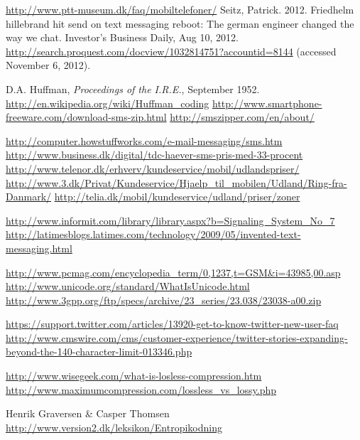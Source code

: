  {\url{http://www.ptt-museum.dk/faq/mobiltelefoner/}}
 Seitz, Patrick. 2012. Friedhelm hillebrand hit send on text messaging reboot: The german engineer changed the way we chat. Investor's Business Daily, Aug 10, 2012. \url{http://search.proquest.com/docview/1032814751?accountid=8144} (accessed November 6, 2012).

 D.A. Huffman, {\it Proceedings of the I.R.E.}, September 1952.
 {\url{http://en.wikipedia.org/wiki/Huffman_coding}}
 {\url{http://www.smartphone-freeware.com/download-sms-zip.html}}
 {\url{http://smszipper.com/en/about/}}

 {\url{http://computer.howstuffworks.com/e-mail-messaging/sms.htm}}
 {\url{http://www.business.dk/digital/tdc-haever-sms-pris-med-33-procent}}
 {\url{http://www.telenor.dk/erhverv/kundeservice/mobil/udlandspriser/}}
 {\url{http://www.3.dk/Privat/Kundeservice/Hjaelp_til_mobilen/Udland/Ring-fra-Danmark/}}
 {\url{http://telia.dk/mobil/kundeservice/udland/priser/zoner}}

 {\url{http://www.informit.com/library/library.aspx?b=Signaling_System_No_7}}
 {\url{http://latimesblogs.latimes.com/technology/2009/05/invented-text-messaging.html}}

 {\url{http://www.pcmag.com/encyclopedia_term/0,1237,t=GSM&i=43985,00.asp}}
 {\url{http://www.unicode.org/standard/WhatIsUnicode.html}}
 {\url{http://www.3gpp.org/ftp/specs/archive/23_series/23.038/23038-a00.zip}}


 {\url{https://support.twitter.com/articles/13920-get-to-know-twitter-new-user-faq}}
 {\url{http://www.cmswire.com/cms/customer-experience/twitter-stories-expanding-beyond-the-140-character-limit-013346.php}}

 {\url{http://www.wisegeek.com/what-is-losless-compression.htm}}
 {\url{http://www.maximumcompression.com/lossless_vs_lossy.php}}

 Henrik Graversen \& Casper Thomsen {\url{http://www.version2.dk/leksikon/Entropikodning}}



